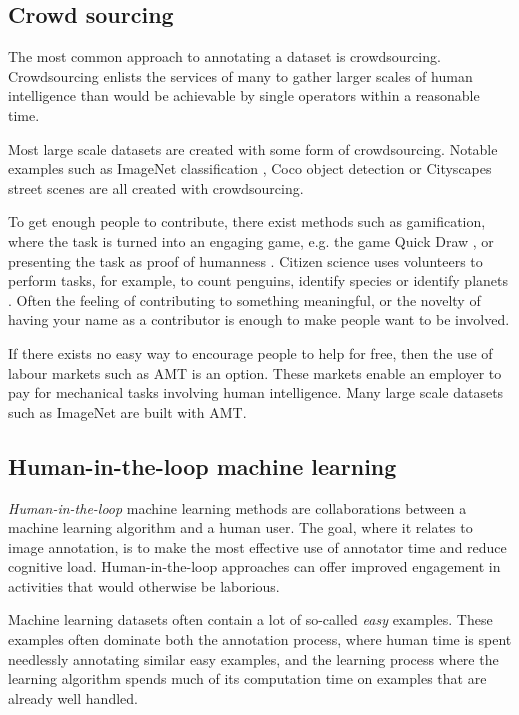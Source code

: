 \subsection {Crowd sourcing}

The most common approach to annotating a dataset is crowdsourcing. Crowdsourcing enlists the services of many to gather larger scales of human intelligence than would be achievable by single operators within a reasonable time.

Most large scale datasets are created with some form of crowdsourcing. Notable examples such as ImageNet classification \cite{JiaDeng2009}, Coco object detection \cite{Lin2014} or Cityscapes street scenes \cite{Cordts2016} are all created with crowdsourcing. 

To get enough people to contribute, there exist methods such as gamification, where the task is turned into an engaging game, e.g. the game Quick Draw \cite{Ha2017}, or presenting the task as proof of humanness \cite{Goodfellow2013a}. Citizen science uses volunteers to perform tasks, for example, to count penguins, identify species or identify planets \cite{Zooniverse, Masters2016}. Often the feeling of contributing to something meaningful, or the novelty of having your name as a contributor is enough to make people want to be involved.

If there exists no easy way to encourage people to help for free, then the use of labour markets such as \gls{AMT} is an option. These markets enable an employer to pay for mechanical tasks involving human intelligence. Many large scale datasets such as ImageNet \cite{Russakovsky2015} are built with \gls{AMT}. 


\subsection{Human-in-the-loop machine learning}

\emph{Human-in-the-loop} machine learning methods are collaborations between a machine learning algorithm and a human user. The goal, where it relates to image annotation, is to make the most effective use of annotator time and reduce cognitive load. Human-in-the-loop approaches can offer improved engagement in activities that would otherwise be laborious.

Machine learning datasets often contain a lot of so-called \emph{easy} examples. These examples often dominate both the annotation process, where human time is spent needlessly annotating similar easy examples, and the learning process where the learning algorithm spends much of its computation time on examples that are already well handled. 

